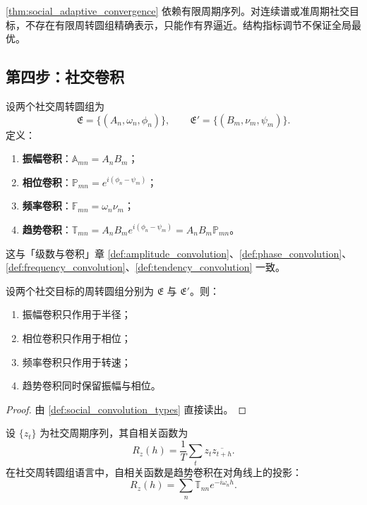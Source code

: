 \begin{remark}[动态调节的边界]\label{rem:social_adaptive_boundary}
\cref{thm:social_adaptive_convergence} 依赖有限周期序列。对连续谱或准周期社交目标，不存在有限周转圆组精确表示，只能作有界逼近。结构指标调节不保证全局最优。
\end{remark}

\subsection{第四步：社交卷积}

\begin{definition}\label{def:social_convolution_types}
设两个社交周转圆组为
\[
\mathfrak E=\{(A_n,\omega_n,\phi_n)\},\qquad
\mathfrak E'=\{(B_m,\nu_m,\psi_m)\}.
\]
定义：
\begin{enumerate}[label=(\roman*)]
    \item \textbf{振幅卷积}：$\mathbb A_{mn}=A_nB_m$；
    \item \textbf{相位卷积}：$\mathbb P_{mn}=e^{i(\phi_n-\psi_m)}$；
    \item \textbf{频率卷积}：$\mathbb F_{mn}=\omega_n\nu_m$；
    \item \textbf{趋势卷积}：$\mathbb T_{mn}=A_nB_m e^{i(\phi_n-\psi_m)}=A_nB_m\mathbb P_{mn}$。
\end{enumerate}
这与「级数与卷积」章 \cref{def:amplitude_convolution}、\cref{def:phase_convolution}、\cref{def:frequency_convolution}、\cref{def:tendency_convolution} 一致。
\end{definition}

\begin{theorem}[三类卷积在社交周转圆组上的作用]\label{thm:social_convolution_action}
设两个社交目标的周转圆组分别为 $\mathfrak E$ 与 $\mathfrak E'$。则：
\begin{enumerate}[label=(\roman*)]
    \item 振幅卷积只作用于半径；
    \item 相位卷积只作用于相位；
    \item 频率卷积只作用于转速；
    \item 趋势卷积同时保留振幅与相位。
\end{enumerate}
\end{theorem}

\begin{proof}
由 \cref{def:social_convolution_types} 直接读出。
\end{proof}

\begin{proposition}[自相关与趋势卷积]\label{prop:social_autocorr_phase_convolution}
设 $\{z_t\}$ 为社交周期序列，其自相关函数为
\[
R_z(h)=\frac1T\sum_t z_t\overline{z_{t+h}}.
\]
在社交周转圆组语言中，自相关函数是趋势卷积在对角线上的投影：
\[
R_z(h)=\sum_n\mathbb T_{nn}e^{-i\omega_n h}.
\]
\end{proposition}

